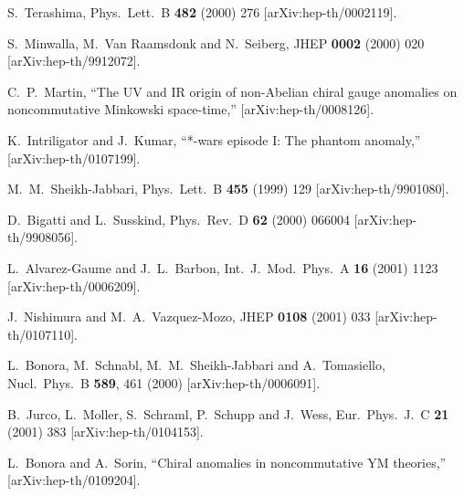 \documentclass[a4paper,12pt]{article}
\begin{document}
\begin{thebibliography}{99}
S.~Terashima,
Phys.\ Lett.\ B {\bf 482} (2000) 276
[arXiv:hep-th/0002119].



S.~Minwalla, M.~Van Raamsdonk and N.~Seiberg,
JHEP {\bf 0002} (2000) 020
[arXiv:hep-th/9912072].


C.~P.~Martin,
``The UV and IR origin of non-Abelian chiral gauge anomalies on  noncommutative Minkowski space-time,''
[arXiv:hep-th/0008126].


K.~Intriligator and J.~Kumar,
``*-wars episode I: The phantom anomaly,''
[arXiv:hep-th/0107199].

M.~M.~Sheikh-Jabbari,
Phys.\ Lett.\ B {\bf 455} (1999) 129
[arXiv:hep-th/9901080].

D.~Bigatti and L.~Susskind,
Phys.\ Rev.\ D {\bf 62} (2000) 066004
[arXiv:hep-th/9908056].


L.~Alvarez-Gaume and J.~L.~Barbon,
Int.\ J.\ Mod.\ Phys.\ A {\bf 16} (2001) 1123
[arXiv:hep-th/0006209].







J.~Nishimura and M.~A.~Vazquez-Mozo,
JHEP {\bf 0108} (2001) 033
[arXiv:hep-th/0107110].





L.~Bonora, M.~Schnabl, M.~M.~Sheikh-Jabbari and A.~Tomasiello,
Nucl.\ Phys.\ B {\bf 589}, 461 (2000)
[arXiv:hep-th/0006091].


B.~Jurco, L.~Moller, S.~Schraml, P.~Schupp and J.~Wess,
Eur.\ Phys.\ J.\ C {\bf 21} (2001) 383
[arXiv:hep-th/0104153].

L.~Bonora and A.~Sorin,
``Chiral anomalies in noncommutative YM theories,''
[arXiv:hep-th/0109204].





\end{thebibliography}
\end{document}
